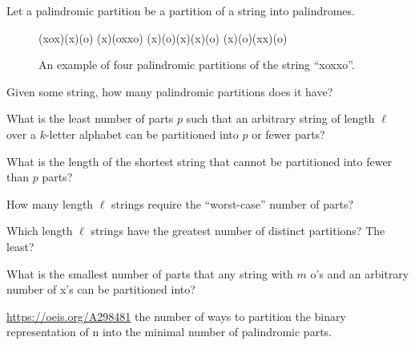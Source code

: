 \documentclass{article}
\begin{document}
Let a palindromic partition be a partition of a string into palindromes.
\begin{figure}[!h]
  \centering
  (xox)(x)(o) \hspace{0.5cm} (x)(oxxo) \hspace{0.5cm} (x)(o)(x)(x)(o) \hspace{0.5cm} (x)(o)(xx)(o)
  \caption{
    An example of four palindromic partitions of the string ``xoxxo''.
  }
\end{figure}
\begin{question}
  Given some string, how many palindromic partitions does it have?
\end{question}
\begin{related}
  \item What is the least number of parts $p$ such that an arbitrary string of
    length $\ell$ over a $k$-letter alphabet can be partitioned into $p$ or
    fewer parts?
  \item What is the length of the shortest string that cannot be partitioned
    into fewer than $p$ parts?
  \item How many length $\ell$ strings require the ``worst-case'' number of
    parts?
  \item Which length $\ell$ strings have the greatest number of distinct
    partitions? The least?
  \item What is the smallest number of parts that any string with $m$ o's
    and an arbitrary number of x's can be partitioned into?
\end{related}
\begin{references}
  \item \url{https://oeis.org/A298481} the number of ways to partition the
    binary representation of n into the minimal number of palindromic parts.
\end{references}
\end{document}
